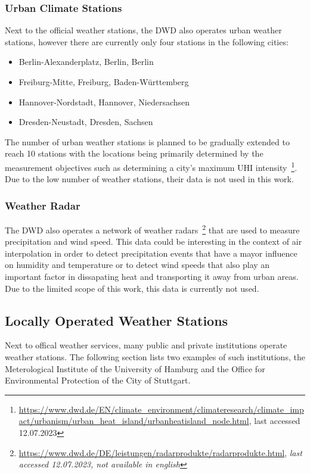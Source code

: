 \subsubsection{Urban Climate Stations}

Next to the official weather stations, the DWD also operates urban weather stations, however there are currently only four stations in the following cities:

\begin{itemize}
    \item Berlin-Alexanderplatz, Berlin, Berlin
    \item Freiburg-Mitte, Freiburg, Baden-Württemberg
    \item Hannover-Nordstadt, Hannover, Niedersachsen
    \item Dresden-Neustadt, Dresden, Sachsen
\end{itemize}

The number of urban weather stations is planned to be gradually extended to reach 10 stations with the locations being primarily determined by the measurement objectives such as determining a city's maximum UHI intensity~\footnote{\url{https://www.dwd.de/EN/climate\_environment/climateresearch/climate\_impact/urbanism/urban\_heat\_island/urbanheatisland\_node.html}, last accessed 12.07.2023}. Due to the low number of weather stations, their data is not used in this work.

\subsubsection{Weather Radar}

The DWD also operates a network of weather radars~\footnote{\url{https://www.dwd.de/DE/leistungen/radarprodukte/radarprodukte.html}, \textit{last accessed 12.07.2023, not available in english}} that are used to measure precipitation and wind speed. This data could be interesting in the context of air interpolation in order to detect precipitation events that have a mayor influence on humidity and temperature or to detect wind speeds that also play an important factor in dissapating heat and transporting it away from urban areas.
Due to the limited scope of this work, this data is currently not used.

\subsection{Locally Operated Weather Stations}

Next to offical weather services, many public and private institutions operate weather stations. The following section lists two examples of such institutions, the Meterological Institute of the University of Hamburg and the Office for Environmental Protection of the City of Stuttgart.

